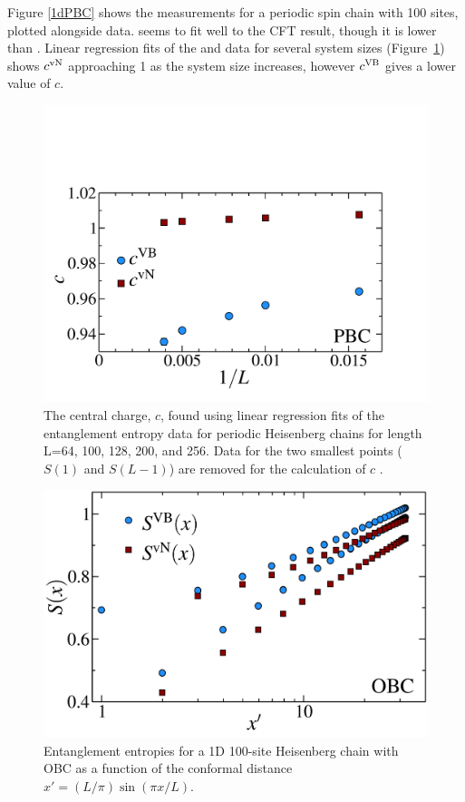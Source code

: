 Figure \ref{1dPBC} shows the \vb measurements for a periodic spin chain with 100 sites, plotted alongside \vn data.  \vb seems to fit well to the CFT result, though it is lower than \vn.
Linear regression fits of the \vb and \vn data for several system sizes (Figure~\ref{c1}) shows $c^{\rm vN}$ approaching 1 as the system size increases, however $c^{\rm VB}$ gives a lower value of $c$.


\begin{figure} {
\includegraphics[width=6in]{./figures/paper1/figure1/thesis_c1.pdf} 
	\centering
	\caption[1D Results for VB EE and von Neumann EE]{
	The central charge, $c$, found using linear regression fits of the entanglement entropy data 	for periodic Heisenberg chains for length L=64, 100, 128, 200, and 256.  Data for the two smallest 	points ($S(1)$ and $S(L-1)$) are removed for the calculation of $c$ .
	\label{c1}}
} 
\end{figure}


\begin{figure} {
	\includegraphics[width=5in]{./figures/paper1/figure1/thesis_obc.pdf} 
	\centering
	\caption[1D OBC Results for VB EE and von Neumann EE]{
	Entanglement entropies for a 1D 100-site Heisenberg chain with OBC as a function of the conformal distance $x'  = (L/\pi)\sin (\pi x/L)$.
	\label{1dOBC}}}
\end{figure}

